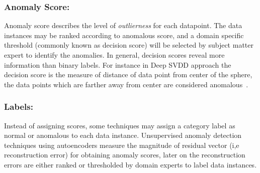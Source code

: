 \subsubsection{Anomaly Score:}
 Anomaly score describes the level of \textit{outlierness} for  each datapoint. The data instances may be ranked according to  anomalous score, and a domain specific threshold (commonly known as decision score) will be selected by subject matter expert to identify the anomalies.  In general, decision scores reveal more information than binary labels. For instance in Deep SVDD approach the decision score is the measure of distance of data point from center of the sphere, the data points which are farther away from center are considered anomalous~\cite{pmlrv80ruff18a}.

\subsubsection{Labels:} Instead of assigning scores, some techniques may assign a category label as normal or anomalous to each data instance. Unsupervised anomaly detection techniques using autoencoders measure  the magnitude of residual vector (i,e reconstruction error) for obtaining anomaly scores, later on the reconstruction errors are either ranked or thresholded by domain experts to label data instances.

